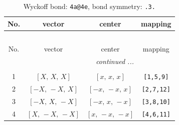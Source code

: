 \documentclass[fleqn,8pt]{jsarticle}
\begin{document}
\renewcommand{\arraystretch}{1.2}
\begin{longtable}{cccc}
\caption{Wyckoff bond: {\tt 4a@4e}, bond symmetry: {\tt .3.}}
 \\
 \hline \hline
No. & vector & center & mapping \\ \hline \endfirsthead

\multicolumn{3}{l}{\tablename\ \thetable{}} \\
 \hline \hline
No. & vector & center & mapping \\ \hline \endhead

 \hline \hline
\multicolumn{3}{r}{\footnotesize\it continued ...} \\ \endfoot

 \hline \hline
\multicolumn{3}{r}{} \\ \endlastfoot

1 & $\left[ X,\, X,\, X \right]$ & $\left[ x,\, x,\, x \right]$ & {\tt [1,5,9]} \\ \hline
2 & $\left[ - X,\, - X,\, X \right]$ & $\left[ - x,\, - x,\, x \right]$ & {\tt [2,7,12]} \\ \hline
3 & $\left[ - X,\, X,\, - X \right]$ & $\left[ - x,\, x,\, - x \right]$ & {\tt [3,8,10]} \\ \hline
4 & $\left[ X,\, - X,\, - X \right]$ & $\left[ x,\, - x,\, - x \right]$ & {\tt [4,6,11]} \\
\end{longtable}
\renewcommand{\arraystretch}{1.2}
\end{document}
